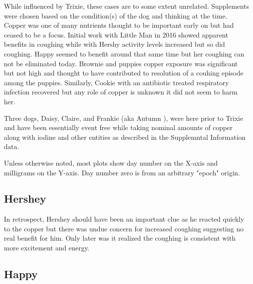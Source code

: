 While influenced by Trixie, these cases are to some extent 
unrelated.  Supplements were 
chosen based on the condition(s) of the dog and thinking at the time.
Copper was one of many nutrients thought to be important early on
but had ceased to be a  focus. %
Initial work with Little Man in 2016 showed apparent benefits in coughing
while with Hershy activity levels increased but so did coughing.
Happy seemed to benefit around that same time but her coughing
can not be eliminated today. Brownie and puppies copper exposure was
significant but not high and thought to have contributed to resolution
of a couhing episode among the puppies. Similarly,  Cookie with
an antibiotic treated respiratory infection recovered
but any role of copper is unknown it did not seem to harm her.

 Three dogs, Daisy, Claire, and Frankie (aka Autumn ), were
here prior to Trixie and have been essentially event free while
taking nominal amounts of copper along with iodine and other
entities as described in the Supplemntal Information data. 

\mjmcasetab

Unless otherwise noted, most plots show day number on the X-axis
and milligrams on the Y-axis.  Day number zero  is from an arbitrary
"epoch" origin. 

\subsection{Hershey}

In retrospect, Hershey should have been an important clue
as he reacted quickly to the copper but there was undue concern
for increased coughing suggesting no real benefit for him. Only
later was it realized the coughing is consistent with
more excitement and energy. 

\mjmhersheycu

\mjmhersheytable

\mjmhersheytext



\subsection{Happy}

\mjmhappycu

\mjmhappytext




